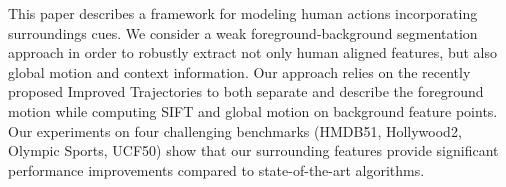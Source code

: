 This paper describes a framework for modeling human actions incorporating surroundings cues. We consider a weak foreground-background segmentation approach in order to robustly extract not only human aligned features, but also global motion and context information. Our approach relies on the recently proposed Improved Trajectories to both separate and describe the foreground motion while computing SIFT and global motion on background feature points. Our experiments on four challenging benchmarks (HMDB51, Hollywood2, Olympic Sports, UCF50) show that our surrounding features provide significant performance improvements compared to state-of-the-art algorithms. 